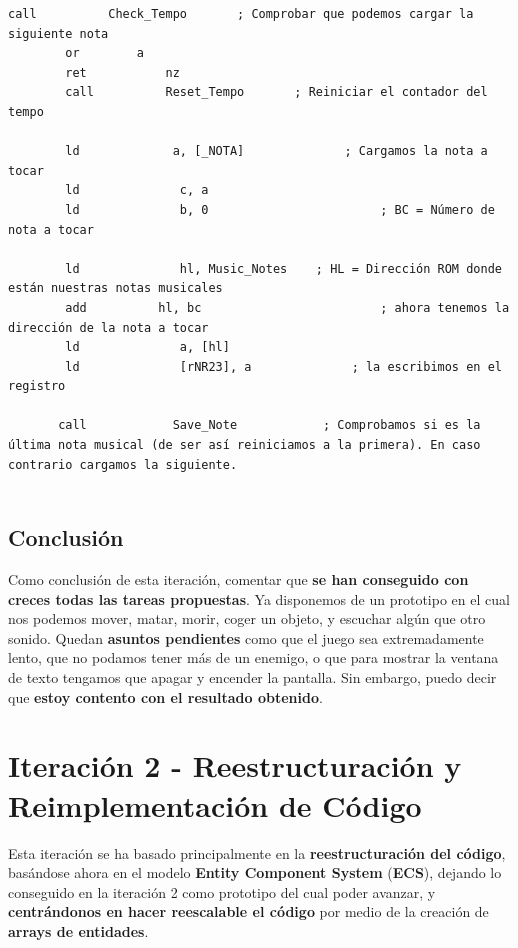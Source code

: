 \begin{lstlisting}[caption={Sonido en Canal 2}, label={code:channel2}]
		call 		  Check_Tempo 		; Comprobar que podemos cargar la siguiente nota
		or 	  	  a
		ret 	  	  nz
		call 	 	  Reset_Tempo 		; Reiniciar el contador del tempo		
		
		ld             a, [_NOTA]              ; Cargamos la nota a tocar
        ld              c, a                    
        ld              b, 0 						; BC = Número de nota a tocar
        
        ld              hl, Music_Notes    ; HL = Dirección ROM donde están nuestras notas musicales
        add          hl, bc                  		; ahora tenemos la dirección de la nota a tocar
        ld              a, [hl]                	
        ld              [rNR23], a              ; la escribimos en el registro
 
       call 		   Save_Note  			; Comprobamos si es la última nota musical (de ser así reiniciamos a la primera). En caso contrario cargamos la siguiente.
       
\end{lstlisting}

\subsection{Conclusión}

Como conclusión de esta iteración, comentar que \textbf{se han conseguido con creces todas las tareas propuestas}. Ya disponemos de un prototipo en el cual nos podemos mover, matar, morir, coger un objeto, y escuchar algún que otro sonido. Quedan \textbf{asuntos pendientes} como que el juego sea extremadamente lento, que no podamos tener más de un enemigo, o que para mostrar la ventana de texto tengamos que apagar y encender la pantalla. Sin embargo, puedo decir que \textbf{estoy contento con el resultado obtenido}.

\clearpage

\section{Iteración 2 - Reestructuración y Reimplementación de Código}

Esta iteración se ha basado principalmente en la \textbf{reestructuración del código}, basándose ahora en el modelo \textbf{Entity Component System} (\textbf{ECS}), dejando lo conseguido en la iteración 2 como prototipo del cual poder avanzar, y \textbf{centrándonos en hacer reescalable el código} por medio de la creación de \textbf{arrays de entidades}.

